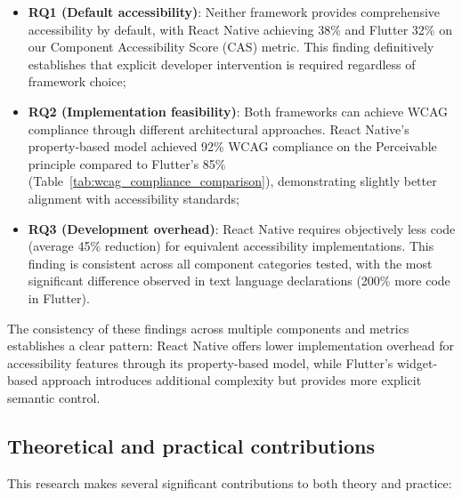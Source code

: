 \begin{itemize}
    \item \textbf{RQ1 (Default accessibility)}: Neither framework provides comprehensive accessibility by default, with React Native achieving 38\% and Flutter 32\% on our Component Accessibility Score (CAS) metric. This finding definitively establishes that explicit developer intervention is required regardless of framework choice;

    \item \textbf{RQ2 (Implementation feasibility)}: Both frameworks can achieve WCAG compliance through different architectural approaches. React Native's property-based model achieved 92\% WCAG compliance on the Perceivable principle compared to Flutter's 85\% (Table~\ref{tab:wcag_compliance_comparison}), demonstrating slightly better alignment with accessibility standards;

    \item \textbf{RQ3 (Development overhead)}: React Native requires objectively less code (average 45\% reduction) for equivalent accessibility implementations. This finding is consistent across all component categories tested, with the most significant difference observed in text language declarations (200\% more code in Flutter).
\end{itemize}

The consistency of these findings across multiple components and metrics establishes a clear pattern: React Native offers lower implementation overhead for accessibility features through its property-based model, while Flutter's widget-based approach introduces additional complexity but provides more explicit semantic control.

\subsection{Theoretical and practical contributions}
\label{subsec:conclusion-contributions}

This research makes several significant contributions to both theory and practice:

